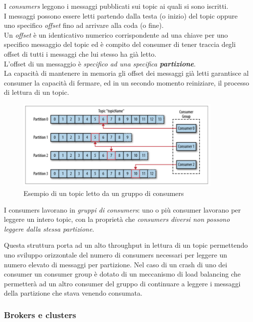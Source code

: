 \documentclass[]{article}
\begin{document}
\normalsize

I \emph{consumers} leggono i messaggi pubblicati sui topic ai quali si
sono iscritti.\\
I messaggi possono essere letti partendo dalla testa (o inizio) del
topic oppure uno specifico \emph{offset} fino ad arrivare alla coda (o
fine).\\
Un \emph{offset} è un identicativo numerico corrispondente ad una chiave
per uno specifico messaggio del topic ed è compito del consumer di tener
traccia degli offset di tutti i messaggi che lui stesso ha già letto.\\
L'offset di un messaggio è \emph{specifico ad una specifica
\textbf{partizione}}.\\
La capacità di mantenere in memoria gli offset dei messaggi già letti
garantisce al consumer la capacità di fermare, ed in un secondo momento
reiniziare, il processo di lettura di un topic.

\begin{figure}
\centering
\includegraphics[width=0.90000\textwidth]{../images/topic-and-consumers.png}
\caption{Esempio di un topic letto da un gruppo di consumers
\label{figure_3}}
\end{figure}

\newpage

I consumers lavorano in \emph{gruppi di consumers}: uno o più consumer
lavorano per leggere un intero topic, con la proprietà che
\emph{consumers diversi non possono leggere dalla stessa partizione}.

Questa struttura porta ad un alto throughput in lettura di un topic
permettendo uno sviluppo orizzontale del numero di consumers necessari
per leggere un numero elevato di messaggi per partizione. Nel caso di un
crash di uno dei consumer un consumer group è dotato di un meccanismo di
load balancing che permetterà ad un altro consumer del gruppo di
continuare a leggere i messaggi della partizione che stava venendo
consumata.

\subsubsection{Brokers e clusters}\label{brokers-e-clusters}
\end{document}
